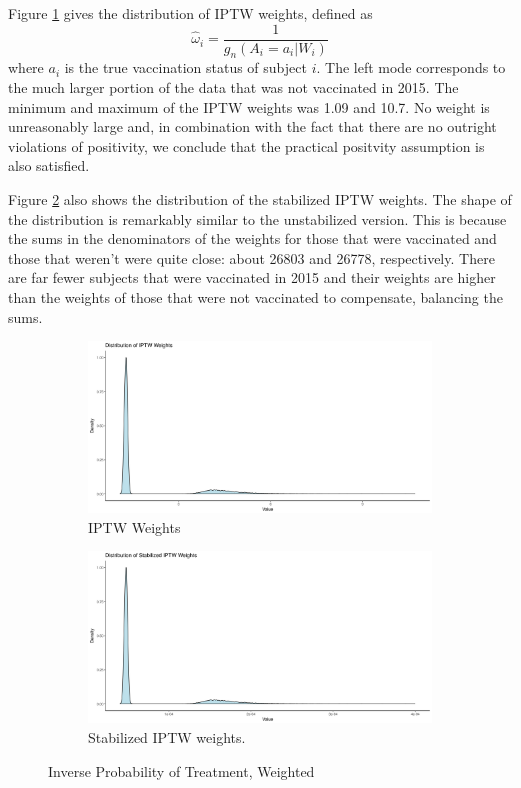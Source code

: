 \documentclass[english, 12pt]{article}
\begin{document}
Figure \ref{fig:IPTW_a} gives the distribution of IPTW weights, defined as
$$\hat{\omega}_i = \frac{1}{g_n(A_i = a_i|W_i)}$$
where $a_i$ is the true vaccination status of subject $i$. The left mode corresponds to the much larger portion of the data that was not vaccinated in 2015. The minimum and maximum of the IPTW weights was 1.09 and 10.7. No weight is unreasonably large and, in combination with the fact that there are no outright violations of positivity, we conclude that the practical positvity assumption is also satisfied.

Figure \ref{fig:IPTW_b} also shows the distribution of the stabilized IPTW weights. The shape of the distribution is remarkably similar to the unstabilized version. This is because the sums in the denominators of the weights for those that were vaccinated and those that weren't were quite close: about 26803 and 26778, respectively. There are far fewer subjects that were vaccinated in 2015 and their weights are higher than the weights of those that were not vaccinated to compensate, balancing the sums.

\begin{figure}
\centering
\begin{subfigure}{\columnwidth}
\centering
    \includegraphics[scale=0.5]{figures/IPTW_weights.png}
    \caption{IPTW Weights}
    \label{fig:IPTW_a}
\end{subfigure}\hspace{0.1in}
\begin{subfigure}{\columnwidth}
\centering
    \includegraphics[scale=0.5]{figures/stabilized_IPTW_weights.png}
    \caption{Stabilized IPTW weights.}
    \label{fig:IPTW_b}
\end{subfigure}
\caption{Inverse Probability of Treatment, Weighted}
\label{fig:IPTW}
\end{figure}
\end{document}
